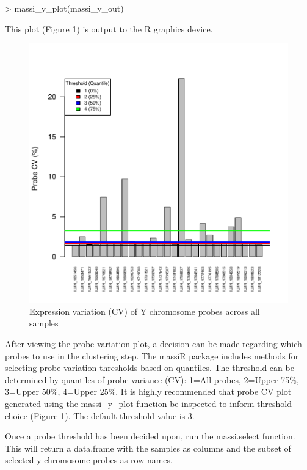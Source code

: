 \documentclass{article}
\begin{document}
\begin{Schunk}
\begin{Sinput}
> massi_y_plot(massi_y_out)
\end{Sinput}
\end{Schunk}

This plot (Figure 1) is output to the R graphics device.

\begin{figure}
\begin{center}
\includegraphics{massiR_Vignette-fig1}
\end{center}
\caption{Expression variation (CV) of Y chromosome probes across all samples}
\label{fig:fig1}
\end{figure}

\clearpage
After viewing the probe variation plot, a decision can be made regarding which probes to use in the clustering step. The massiR package includes methods for selecting probe variation thresholds based on quantiles. The threshold can be determined by quantiles of probe variance (CV): 1=All probes, 2=Upper 75\%, 3=Upper 50\%, 4=Upper 25\%. It is highly recommended that probe CV plot generated using the massi_y_plot function be inspected to inform threshold choice (Figure 1). The default threshold value is 3.

Once a probe threshold has been decided upon, run the massi.select function. This will return a data.frame with the samples as columns and the subset of selected y chromosome probes as row names.
\end{document}
